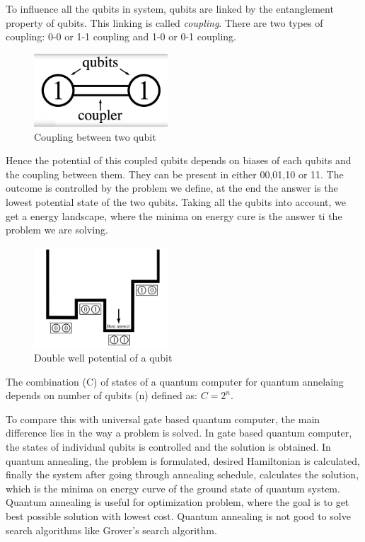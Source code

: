 \documentclass[12pt,conference]{IEEEtran}
\begin{document}
To influence all the qubits in system, qubits are linked by the entanglement property of qubits. This linking is called \emph{coupling}. There are two types of coupling: 0-0 or 1-1 coupling and 1-0 or 0-1 coupling. 

\begin{figure}[h]
  \centering
  \includegraphics[width=5cm]{qubit_couplet.png}
  \caption{Coupling between two qubit}
  \label{fig:QbitC}
\end{figure}

Hence the potential of this coupled qubits depends on biases of each qubits and the coupling between them. They can be present in either 00,01,10 or 11. The outcome is controlled by the problem we define, at the end the answer is the lowest potential state of the two qubits. Taking all the qubits into account, we get a energy landscape, where the minima on energy cure is the answer ti the problem we are solving. 

\begin{figure}[h]
  \centering
  \includegraphics[width=5cm]{entangled_low.png}
  \caption{Double well potential of a qubit}
  \label{fig:ELQbit}
\end{figure}

The combination (C) of states of a quantum computer for quantum annelaing depends on number of qubits (n) defined as: $ C = 2^n$.

To compare this with universal gate based quantum computer, the main difference lies in the way a problem is solved. In gate based quantum computer, the states of individual qubits is controlled and the solution is obtained. In quantum annealing, the problem is formulated, desired Hamiltonian is calculated, finally the system after going through annealing schedule, calculates the solution, which is the minima on energy curve of the ground state of quantum system. Quantum annealing is useful for optimization problem, where the goal is to get best possible solution with lowest cost. Quantum annealing is not good to solve search algorithms like Grover's search algorithm. 
\end{document}
